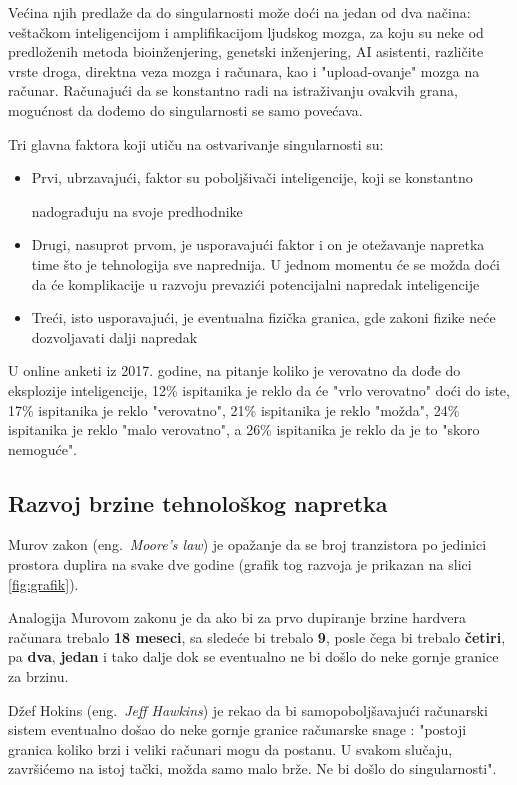 \documentclass[a4paper]{article}
\begin{document}
Većina njih predlaže da do singularnosti može doći na jedan od dva načina: veštačkom inteligencijom i amplifikacijom ljudskog mozga, za koju su neke od predloženih metoda bioinženjering, genetski inženjering, AI asistenti, različite vrste droga, direktna veza mozga i računara, kao i "upload-ovanje" mozga na računar. Računajući da se konstantno radi na istraživanju ovakvih grana, mogućnost da dođemo do singularnosti se samo povećava. 

Tri glavna faktora koji utiču na ostvarivanje singularnosti su: \cite{mog-2}
\begin{itemize}
\item Prvi, ubrzavajući, faktor su poboljšivači inteligencije, koji se konstantno 

nadograđuju na svoje predhodnike 
\item Drugi, nasuprot prvom, je usporavajući faktor i on je otežavanje napretka time što je tehnologija sve naprednija. U jednom momentu će se možda doći da će komplikacije u razvoju prevazići potencijalni napredak inteligencije
\item Treći, isto usporavajući, je eventualna fizička granica, gde zakoni fizike neće dozvoljavati dalji napredak  
\end{itemize} 
U online anketi iz 2017. godine, na pitanje koliko je verovatno da dođe do eksplozije inteligencije, 12\% ispitanika je reklo da će "vrlo verovatno" doći do iste, 17\% ispitanika je reklo "verovatno", 21\% ispitanika je reklo "možda", 24\% ispitanika je reklo "malo verovatno", a 26\% ispitanika je reklo da je to "skoro nemoguće". \cite{mog-3}

\subsection{Razvoj brzine tehnološkog napretka}

Murov zakon (eng.~{\em Moore's law}) je opažanje da se broj tranzistora po jedinici prostora duplira na svake dve godine (grafik tog razvoja je prikazan na slici \ref{fig:grafik}). 

Analogija Murovom zakonu je da ako bi za prvo dupiranje brzine hardvera računara trebalo \textbf{18 meseci}, sa sledeće bi trebalo \textbf{9}, posle čega bi trebalo \textbf{četiri}, pa \textbf{dva}, \textbf{jedan} i tako dalje dok se eventualno ne bi došlo do neke gornje granice za brzinu.

Džef Hokins (eng.~{\em Jeff Hawkins}) je rekao da bi samopoboljšavajući računarski sistem eventualno došao do neke gornje granice računarske snage : "postoji granica koliko brzi i veliki računari mogu da postanu. U svakom slučaju, završićemo na istoj tački, možda samo malo brže. Ne bi došlo do singularnosti". \cite{mog-5}
\end{document}
